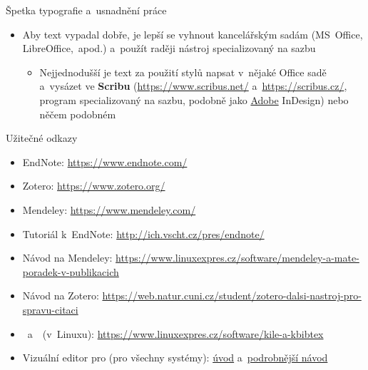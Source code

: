 \documentclass[compress, ucs, xelatex, xcolor=dvipsnames, print,
	hyperref={
		bookmarks=true,
		unicode=true,
		colorlinks=true,
		pdftitle={Citacni software},
		plainpages=false,
		pdfauthor={Vojtech Zeisek},
		pdfsubject={Kratky uvod do citacniho software},
		pdfcreator={XeLaTeX},
		pdfkeywords={citace, reference, software, literatura},
		linkcolor=Red,
		anchorcolor=Red,
		citecolor=Green,
		filecolor=Magenta,
		menucolor=Green,
		urlcolor=Cyan,
		pdftex},
	url={hyphens, lowtilde} %
	]{beamer}
\begin{document}
\begin{frame}[allowframebreaks]{Špetka typografie a~usnadnění práce}
\begin{itemize}
		\item Aby text vypadal dobře, je lepší se vyhnout kancelářským sadám (MS~Office, LibreOffice,~apod.) a~použít raději nástroj specializovaný na sazbu
			\begin{itemize}
				\item Nejjednodušší je text za použití stylů napsat v~nějaké Office sadě a~vysázet ve \textbf{Scribu} (\url{https://www.scribus.net/} a~\url{https://scribus.cz/}, program specializovaný na sazbu, podobně jako \href{https://www.natur.cuni.cz/fakulta/cit/podpora-uzivatelu/softwarove-licence/adobe}{Adobe} InDesign) nebo něčem podobném
			\end{itemize}
	\end{itemize}
\end{frame}

\begin{frame}{Užitečné odkazy}
	\begin{itemize}
		\item EndNote: \url{https://www.endnote.com/}
		\item Zotero: \url{https://www.zotero.org/}
		\item Mendeley: \url{https://www.mendeley.com/}
		\item Tutoriál k~EndNote: \url{http://ich.vscht.cz/pres/endnote/}
		\item Návod na Mendeley: \url{https://www.linuxexpres.cz/software/mendeley-a-mate-poradek-v-publikacich}
		\item Návod na Zotero: \url{https://web.natur.cuni.cz/student/zotero-dalsi-nastroj-pro-spravu-citaci}
		\item \BibTeX~a~\XeLaTeX~(v~Linuxu): \url{https://www.linuxexpres.cz/software/kile-a-kbibtex}
		\item Vizuální editor pro \XeLaTeX (pro všechny systémy): \href{https://www.linuxexpres.cz/software/textovy-editor-lyx-latex-pro-line}{úvod} a~\href{https://www.linuxexpres.cz/praxe/diplomka-lyx}{podrobnější návod}
	\end{itemize}
\end{frame}
\end{document}
